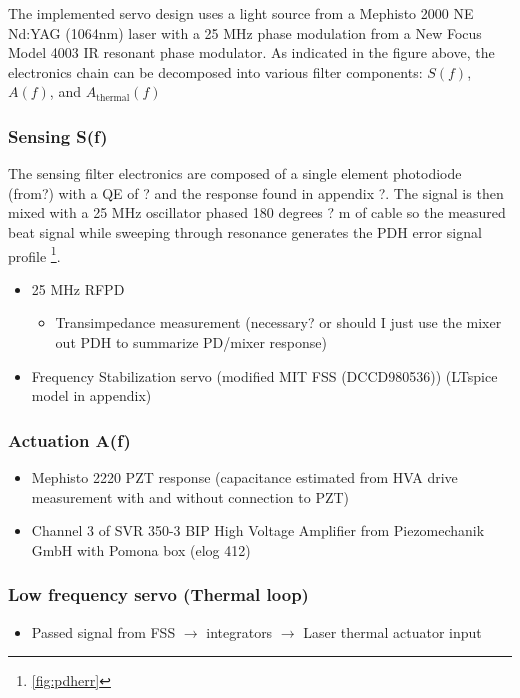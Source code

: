 The implemented servo design uses a light source from a Mephisto 2000 NE Nd:YAG (1064nm) laser with a 25 MHz phase modulation from a New Focus Model 4003 IR resonant phase modulator. As indicated in the figure above, the electronics chain can be decomposed into various filter components: $S(f)$, $A(f)$, and $A_\mathrm{thermal}(f)$

\subsubsection{Sensing S(f)}
The sensing filter electronics are composed of a single element photodiode (from?) with a QE of ? and the response found in appendix ?. The signal is then mixed with a 25 MHz oscillator phased 180 degrees ? m of cable so the measured beat signal while sweeping through resonance generates the PDH error signal profile \footnote{\autoref{fig:pdherr}}.
\begin{itemize}
\item 25 MHz RFPD
\begin{itemize}
\item Transimpedance measurement (necessary? or should I just use the mixer out PDH to summarize PD/mixer response)
\end{itemize}
\item Frequency Stabilization servo (modified MIT FSS (DCCD980536)) (LTspice model in appendix)
\end{itemize}


\subsubsection{Actuation A(f)}
\begin{itemize}
\item Mephisto 2220 PZT response (capacitance estimated from HVA drive measurement with and without connection to PZT)
\item Channel 3 of SVR 350-3 BIP High Voltage Amplifier from Piezomechanik GmbH with Pomona box (elog 412)

\end{itemize}

\subsubsection{Low frequency servo (Thermal loop)}
\begin{itemize}
\item Passed signal from FSS $\rightarrow$ integrators $\rightarrow$ Laser thermal actuator input
\end{itemize}

